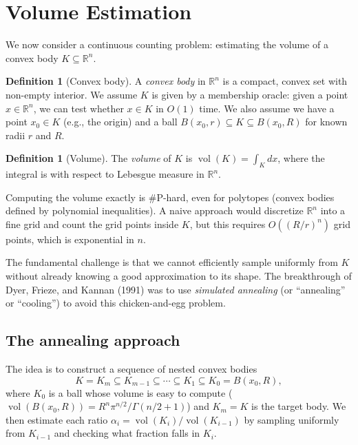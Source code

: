 \documentclass[twoside,12pt]{book}
\theoremstyle{plain}
\theoremstyle{definition}
\newtheorem{definition}[theorem]{Definition}
\theoremstyle{remark}
\begin{document}
\section{Volume Estimation}
\label{sec:volume}

We now consider a continuous counting problem: estimating the volume of a convex body $K \subseteq \mathbb{R}^n$.

\begin{definition}[Convex body]
A \emph{convex body} in $\mathbb{R}^n$ is a compact, convex set with non-empty interior. We assume $K$ is given by a membership oracle: given a point $x \in \mathbb{R}^n$, we can test whether $x \in K$ in $O(1)$ time. We also assume we have a point $x_0 \in K$ (e.g., the origin) and a ball $B(x_0, r) \subseteq K \subseteq B(x_0, R)$ for known radii $r$ and $R$.
\end{definition}

\begin{definition}[Volume]
The \emph{volume} of $K$ is $\operatorname{vol}(K) = \int_K dx$, where the integral is with respect to Lebesgue measure in $\mathbb{R}^n$.
\end{definition}

Computing the volume exactly is \#P-hard, even for polytopes (convex bodies defined by polynomial inequalities). A naive approach would discretize $\mathbb{R}^n$ into a fine grid and count the grid points inside $K$, but this requires $O((R/r)^n)$ grid points, which is exponential in $n$.

The fundamental challenge is that we cannot efficiently sample uniformly from $K$ without already knowing a good approximation to its shape. The breakthrough of Dyer, Frieze, and Kannan (1991) was to use \emph{simulated annealing} (or ``annealing'' or ``cooling'') to avoid this chicken-and-egg problem.

\subsection{The annealing approach}

The idea is to construct a sequence of nested convex bodies
\[
K = K_m \subseteq K_{m-1} \subseteq \cdots \subseteq K_1 \subseteq K_0 = B(x_0, R),
\]
where $K_0$ is a ball whose volume is easy to compute ($\operatorname{vol}(B(x_0, R)) = R^n \pi^{n/2} / \Gamma(n/2 + 1)$) and $K_m = K$ is the target body. We then estimate each ratio $\alpha_i = \operatorname{vol}(K_i) / \operatorname{vol}(K_{i-1})$ by sampling uniformly from $K_{i-1}$ and checking what fraction falls in $K_i$.
\end{document}
